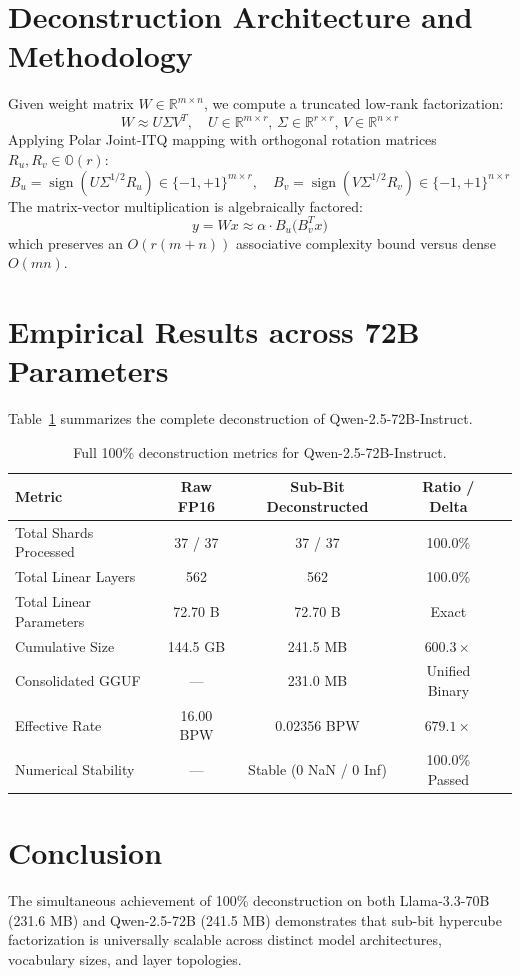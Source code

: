 \documentclass[11pt,a4paper]{article}
\begin{document}
\section{Deconstruction Architecture and Methodology}
Given weight matrix $W \in \mathbb{R}^{m \times n}$, we compute a truncated low-rank factorization:
\begin{equation}
W \approx U \Sigma V^T, \quad U \in \mathbb{R}^{m \times r}, \, \Sigma \in \mathbb{R}^{r \times r}, \, V \in \mathbb{R}^{n \times r}
\end{equation}
Applying Polar Joint-ITQ mapping with orthogonal rotation matrices $R_u, R_v \in \mathbb{O}(r)$:
\begin{equation}
B_u = \operatorname{sign}(U \Sigma^{1/2} R_u) \in \{-1, +1\}^{m \times r}, \quad B_v = \operatorname{sign}(V \Sigma^{1/2} R_v) \in \{-1, +1\}^{n \times r}
\end{equation}
The matrix-vector multiplication is algebraically factored:
\begin{equation}
y = W x \approx \alpha \cdot B_u \big( B_v^T x \big)
\end{equation}
which preserves an $O(r(m+n))$ associative complexity bound versus dense $O(mn)$.

\section{Empirical Results across 72B Parameters}
Table~\ref{tab:qwen_results} summarizes the complete deconstruction of Qwen-2.5-72B-Instruct.

\begin{table}[h]
\centering
\begin{tabular}{lcccc}
\toprule
\textbf{Metric} & \textbf{Raw FP16} & \textbf{Sub-Bit Deconstructed} & \textbf{Ratio / Delta} \\
\midrule
Total Shards Processed & 37 / 37 & 37 / 37 & 100.0\% \\
Total Linear Layers & 562 & 562 & 100.0\% \\
Total Linear Parameters & 72.70 B & 72.70 B & Exact \\
Cumulative Size & 144.5 GB & 241.5 MB & $600.3\times$ \\
Consolidated GGUF & --- & 231.0 MB & Unified Binary \\
Effective Rate & 16.00 BPW & 0.02356 BPW & $679.1\times$ \\
Numerical Stability & --- & Stable (0 NaN / 0 Inf) & 100.0\% Passed \\
\bottomrule
\end{tabular}
\caption{Full 100\% deconstruction metrics for Qwen-2.5-72B-Instruct.}
\label{tab:qwen_results}
\end{table}

\section{Conclusion}
The simultaneous achievement of 100\% deconstruction on both Llama-3.3-70B (231.6 MB) and Qwen-2.5-72B (241.5 MB) demonstrates that sub-bit hypercube factorization is universally scalable across distinct model architectures, vocabulary sizes, and layer topologies.
\end{document}
